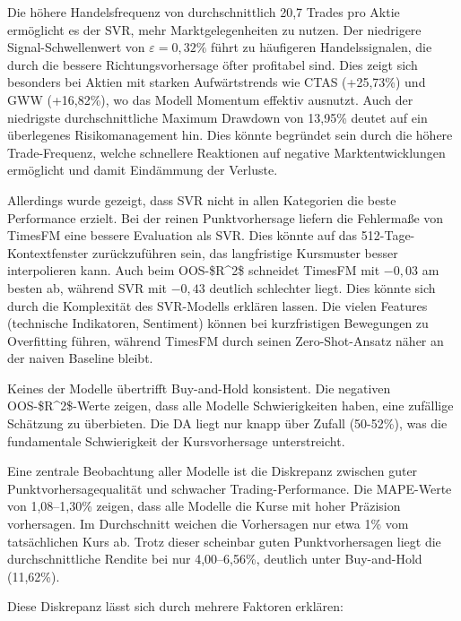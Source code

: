 Die höhere Handelsfrequenz von durchschnittlich 20,7 Trades pro Aktie ermöglicht es der SVR, mehr Marktgelegenheiten zu nutzen. Der niedrigere Signal-Schwellenwert von $\varepsilon = 0{,}32\%$ führt zu häufigeren Handelssignalen, die durch die bessere Richtungsvorhersage öfter profitabel sind. Dies zeigt sich besonders bei Aktien mit starken Aufwärtstrends wie CTAS (+25,73\%) und GWW (+16,82\%), wo das Modell Momentum effektiv ausnutzt. Auch der niedrigste durchschnittliche Maximum Drawdown von 13,95\% deutet auf ein überlegenes Risikomanagement hin. Dies könnte begründet sein durch die höhere Trade-Frequenz, welche schnellere Reaktionen auf negative Marktentwicklungen ermöglicht und damit Eindämmung der Verluste.

Allerdings wurde gezeigt, dass SVR nicht in allen Kategorien die beste Performance erzielt. Bei der reinen Punktvorhersage liefern die Fehlermaße von TimesFM eine bessere Evaluation als SVR. Dies könnte auf das 512-Tage-Kontextfenster zurückzuführen sein, das langfristige Kursmuster besser interpolieren kann. Auch beim \ac{OOS-$R^2$} schneidet TimesFM mit $-0{,}03$ am besten ab, während SVR mit $-0{,}43$ deutlich schlechter liegt. Dies könnte sich durch die Komplexität des SVR-Modells erklären lassen. Die vielen Features (technische Indikatoren, Sentiment) können bei kurzfristigen Bewegungen zu Overfitting führen, während TimesFM durch seinen Zero-Shot-Ansatz näher an der naiven Baseline bleibt.

Keines der Modelle übertrifft Buy-and-Hold konsistent. Die negativen \ac{OOS-$R^2$}-Werte zeigen, dass alle Modelle Schwierigkeiten haben, eine zufällige Schätzung zu überbieten. Die \ac{DA} liegt nur knapp über Zufall (50-52\%), was die fundamentale Schwierigkeit der Kursvorhersage unterstreicht.

Eine zentrale Beobachtung aller Modelle ist die Diskrepanz zwischen guter Punktvorhersagequalität und schwacher Trading-Performance. Die \ac{MAPE}-Werte von 1,08--1,30\% zeigen, dass alle Modelle die Kurse mit hoher Präzision vorhersagen. Im Durchschnitt weichen die Vorhersagen nur etwa 1\% vom tatsächlichen Kurs ab. Trotz dieser scheinbar guten Punktvorhersagen liegt die durchschnittliche Rendite bei nur 4,00--6,56\%, deutlich unter Buy-and-Hold (11,62\%).

Diese Diskrepanz lässt sich durch mehrere Faktoren erklären:

